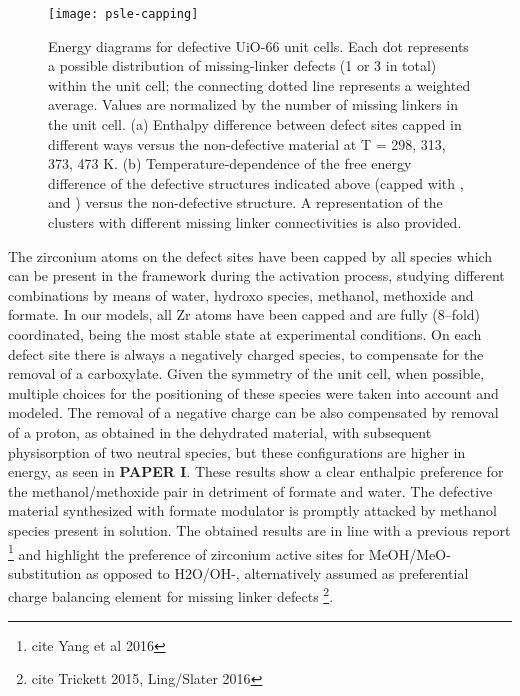 %
\begin{figure}[!htbp]
	\centering
	\texttt{[image: psle-capping]}
	\caption{Energy diagrams for defective UiO-66 unit cells. Each dot represents a possible distribution of missing-linker defects (1 or 3 in total) within the unit cell; the connecting dotted line represents a weighted average. Values are normalized by the number of missing linkers in the unit cell. (a) Enthalpy difference between defect sites capped in different ways versus the non-defective material at T = 298, 313, 373, 473 K. (b) Temperature-dependence of the free energy difference of the defective structures indicated above (capped with ,  and ) versus the non-defective structure. A representation of the clusters with different missing linker connectivities is also provided.}
	\label{fig:psle-capping}
\end{figure}
%
The zirconium atoms on the defect sites have been capped by all species which can be present in the framework during the activation process, studying different combinations by means of water, hydroxo species, methanol, methoxide and formate. In our models, all Zr atoms have been capped and are fully (8--fold) coordinated, being the most stable state at experimental conditions. On each defect site there is always a negatively charged species, to compensate for the removal of a carboxylate. Given the symmetry of the unit cell, when possible, multiple choices for the positioning of these species were taken into account and modeled. The removal of a negative charge can be also compensated by removal of a proton, as obtained in the dehydrated material, with subsequent physisorption of two neutral species, but these configurations are higher in energy, as seen in \textbf{PAPER I}. These results show a clear enthalpic preference for the methanol/methoxide pair in detriment of formate and water. The defective material synthesized with formate modulator is promptly attacked by methanol species present in solution. The obtained results are in line with a previous report \footnote{cite Yang et al 2016} and highlight the preference of zirconium active sites for MeOH/MeO- substitution as opposed to H2O/OH-, alternatively assumed as preferential charge balancing element for missing linker defects \footnote{cite Trickett 2015, Ling/Slater 2016}.\\

